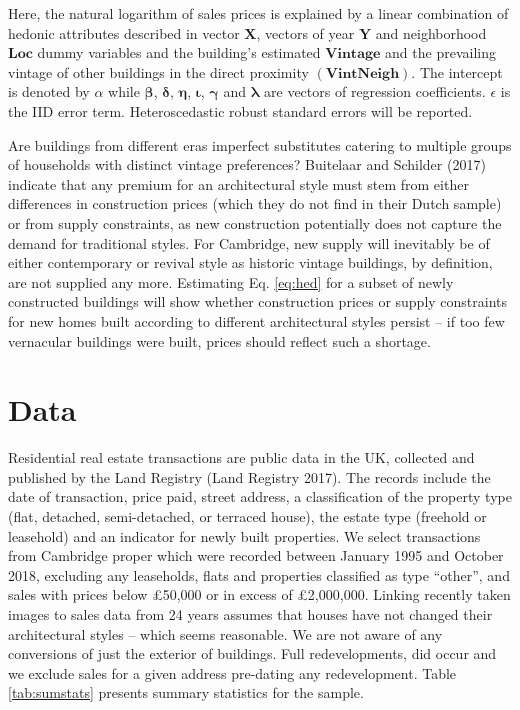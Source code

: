 \documentclass[]{article}
\begin{document}
Here, the natural logarithm of sales prices is explained by a linear
combination of hedonic attributes described in vector \(\mathbf{X}\),
vectors of year \(\mathbf{Y}\) and neighborhood \(\bm{Loc}\) dummy
variables and the building's estimated \(\mathbf{Vintage}\) and the
prevailing vintage of other buildings in the direct proximity
\((\mathbf{VintNeigh})\). The intercept is denoted by \(\alpha\) while
\(\bm{\beta}\), \(\bm{\delta}\), \(\bm{\eta}\), \(\bm{\iota}\),
\(\bm{\gamma}\) and \(\bm{\lambda}\) are vectors of regression
coefficients. \(\epsilon\) is the IID error term. Heteroscedastic robust
standard errors will be reported.

Are buildings from different eras imperfect substitutes catering to
multiple groups of households with distinct vintage preferences?
Buitelaar and Schilder (2017) indicate that any premium for an
architectural style must stem from either differences in construction
prices (which they do not find in their Dutch sample) or from supply
constraints, as new construction potentially does not capture the demand
for traditional styles. For Cambridge, new supply will inevitably be of
either contemporary or revival style as historic vintage buildings, by
definition, are not supplied any more. Estimating Eq. \ref{eq:hed} for a
subset of newly constructed buildings will show whether construction
prices or supply constraints for new homes built according to different
architectural styles persist -- if too few vernacular buildings were
built, prices should reflect such a shortage.

\hypertarget{data}{%
\section{Data}\label{data}}

Residential real estate transactions are public data in the UK,
collected and published by the Land Registry (Land Registry 2017). The
records include the date of transaction, price paid, street address, a
classification of the property type (flat, detached, semi-detached, or
terraced house), the estate type (freehold or leasehold) and an
indicator for newly built properties. We select transactions from
Cambridge proper which were recorded between January 1995 and October
2018, excluding any leaseholds, flats and properties classified as type
``other'', and sales with prices below £50,000 or in excess of
£2,000,000. Linking recently taken images to sales data from 24 years
assumes that houses have not changed their architectural styles -- which
seems reasonable. We are not aware of any conversions of just the
exterior of buildings. Full redevelopments, did occur and we exclude
sales for a given address pre-dating any redevelopment. Table
\ref{tab:sumstats} presents summary statistics for the sample.
\end{document}
